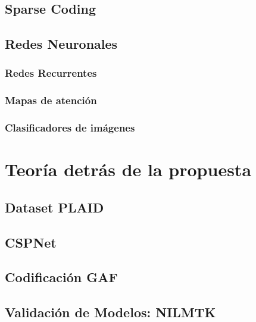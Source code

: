 \subsection{Sparse Coding}


\subsection{Redes Neuronales}
\subsubsection{Redes Recurrentes}
\subsubsection{Mapas de atención}
\subsubsection{Clasificadores de imágenes}


\section{Teoría detrás de la propuesta}
\subsection{Dataset PLAID}
\subsection{CSPNet} 
\subsection{Codificación GAF} 
\subsection{Validación de Modelos: NILMTK}  

